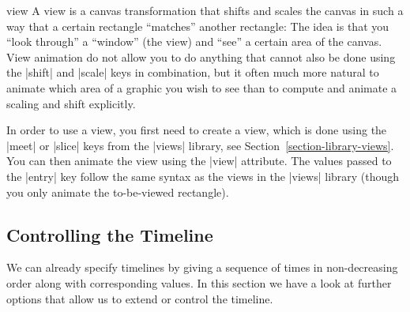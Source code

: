 \begin{tikzanimateattribute}{view}
    A view is a canvas transformation that shifts and scales the canvas in such
    a way that a certain rectangle ``matches'' another rectangle: The idea is
    that you ``look through'' a ``window'' (the view) and ``see'' a certain
    area of the canvas. View animation do not allow you to do anything that
    cannot also be done using the |shift| and |scale| keys in combination, but
    it often much more natural to animate which area of a graphic you wish to
    see than to compute and animate a scaling and shift explicitly.

    In order to use a view, you first need to create a view, which is done
    using the |meet| or |slice| keys from the |views| library, see
    Section~\ref{section-library-views}. You can then animate the view using
    the |view| attribute. The values passed to the |entry| key follow the same
    syntax as the views in the |views| library (though you only animate the
    to-be-viewed rectangle).
\begin{codeexample}[
    preamble={\usetikzlibrary{animations,views}},
    animation list={0.5,1,1.5,2},
    animation bb={(1.1,-0.9) rectangle (2.9,0.9)},
]
\end{codeexample}
\end{tikzanimateattribute}


\subsection{Controlling the Timeline}
\label{section-anim-timeline}

We can already specify timelines by giving a sequence of times in
non-decreasing order along with corresponding values. In this section we have a
look at further options that allow us to extend or control the timeline.


